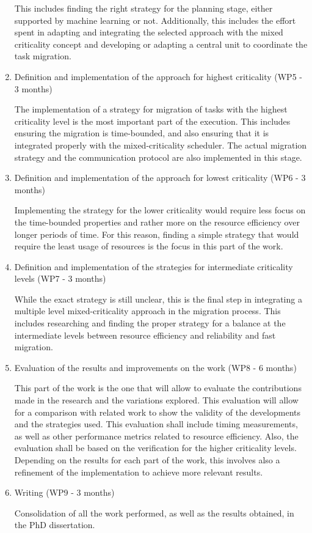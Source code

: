 \begin{enumerate}
	This includes finding the right strategy for the planning stage, either supported by machine learning or not. Additionally, this includes the effort spent in adapting and integrating the selected approach with the mixed criticality concept and developing or adapting a central unit to coordinate the task migration.
	
	\item	Definition and implementation of the approach for highest criticality (WP5 - 3 months)
	
	The implementation of a strategy for migration of tasks with the highest criticality level is the most important part of the execution. This includes ensuring the migration is time-bounded, and also ensuring that it is integrated properly with the mixed-criticality scheduler. The actual migration strategy and the communication protocol are also implemented in this stage.
	
	\item	Definition and implementation of the approach for lowest criticality (WP6 - 3 months)
	
	Implementing the strategy for the lower criticality would require less focus on the time-bounded properties and rather more on the resource efficiency over longer periods of time. For this reason, finding a simple strategy that would require the least usage of resources is the focus in this part of the work.

	\item	Definition and implementation of the strategies for intermediate criticality levels (WP7 - 3 months)
	
	While the exact strategy is still unclear, this is the final step in integrating a multiple level mixed-criticality approach in the migration process. This includes researching and finding the proper strategy for a balance at the intermediate levels between resource efficiency and reliability and fast migration.
	
	\item	Evaluation of the results and improvements on the work (WP8 - 6 months)
	
	This part of the work is the one that will allow to evaluate the contributions made in the research and the variations explored. This evaluation will allow for a comparison with related work to show the validity of the developments and the strategies used. This evaluation shall include timing measurements, as well as other performance metrics related to resource efficiency. Also, the evaluation shall be based on the verification for the higher criticality levels. Depending on the results for each part of the work, this involves also a refinement of the implementation to achieve more relevant results.
	
	\item Writing (WP9 - 3 months)
	
	Consolidation of all the work performed, as well as the results obtained, in the PhD dissertation. 
\end{enumerate}




	

